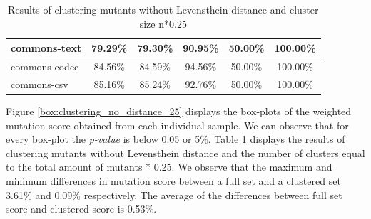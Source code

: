 \documentclass[conference,draftclsnofoot,onecolumn]{IEEEtran}
\begin{document}
\begin{table}[ht]
\begin{tabular}{|l|c|c|c|c|c|}
commons-text                  & 79.29\%                                                                                 & 79.30\%                                                                                     & 90.95\%                                                                              & 50.00\%                                                                               & 100.00\%                                                                             \\ \hline
commons-codec                 & 84.56\%                                                                                 & 84.59\%                                                                                     & 94.56\%                                                                              & 50.00\%                                                                               & 100.00\%                                                                             \\ \hline
commons-csv                   & 85.16\%                                                                                 & 85.24\%                                                                                     & 92.76\%                                                                              & 50.00\%                                                                               & 100.00\%                                                                             \\ \hline
\end{tabular}
\caption{\label{tab:clustering_no_distance_25}Results of clustering mutants without Levensthein distance and cluster size n*0.25}
\end{table}

Figure \ref{box:clustering_no_distance_25} displays the box-plots of the weighted mutation score obtained from each individual sample.
We can observe that for every box-plot the \textit{p-value} is below 0.05 or 5\%.
Table \ref{tab:clustering_no_distance_25} displays the results of clustering mutants without Levensthein distance and the number of clusters equal to the total amount of mutants * 0.25. 
We observe that the maximum and minimum differences in mutation score between a full set and a clustered set  3.61\% and 0.09\% respectively.
The average of the differences between full set score and clustered score is 0.53\%.
\end{document}
